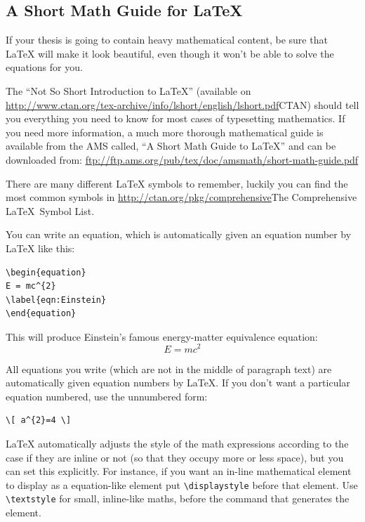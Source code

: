 \subsection{A Short Math Guide for \LaTeX{}}

If your thesis is going to contain heavy mathematical content, be sure that \LaTeX{} will make it look beautiful, even though it won't be able to solve the equations for you.

The \enquote{Not So Short Introduction to \LaTeX} (available on \url{http://www.ctan.org/tex-archive/info/lshort/english/lshort.pdf}{CTAN}) should tell you everything you need to know for most cases of typesetting mathematics. If you need more information, a much more thorough mathematical guide is available from the AMS called, \enquote{A Short Math Guide to \LaTeX} and can be downloaded from:
\url{ftp://ftp.ams.org/pub/tex/doc/amsmath/short-math-guide.pdf}

There are many different \LaTeX{} symbols to remember, luckily you can find the most common symbols in \url{http://ctan.org/pkg/comprehensive}{The Comprehensive \LaTeX~Symbol List}.

You can write an equation, which is automatically given an equation number by \LaTeX{} like this:
\begin{verbatim}
\begin{equation}
E = mc^{2}
\label{eqn:Einstein}
\end{equation}
\end{verbatim}

This will produce Einstein's famous energy-matter equivalence equation:
\begin{equation}
E = mc^{2}
\label{eqn:Einstein}
\end{equation}

All equations you write (which are not in the middle of paragraph text) are automatically given equation numbers by \LaTeX{}. If you don't want a particular equation numbered, use the unnumbered form:
\begin{verbatim}
\[ a^{2}=4 \]
\end{verbatim}

\LaTeX{} automatically adjusts the style of the math expressions according to the case if they are inline or not (so that they occupy more or less space), but you can set this explicitly. For instance, if you want an in-line mathematical element to display as a equation-like element put \verb|\displaystyle| before that element. Use \verb|\textstyle| for small, inline-like maths, before the command that generates the element.

